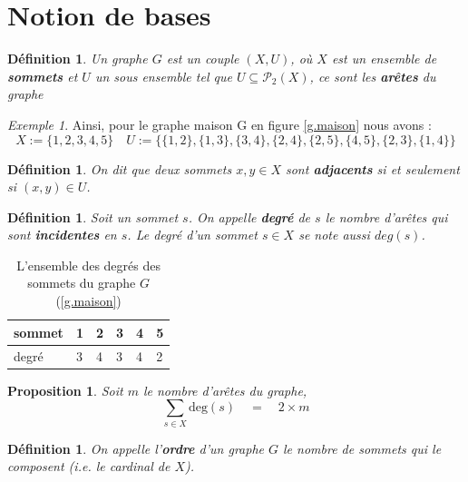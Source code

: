 \documentclass[12pt,a4paper]{scrartcl}
\theoremstyle{plain}
\newtheorem{proposition}[theoreme]{Proposition}
\newtheorem{definition}[theoreme]{Définition}
\theoremstyle{remark}
\newtheorem*{exemple}{Exemple}
\begin{document}
\section{Notion de bases}

\begin{definition}
Un graphe $G$ est un couple $(X,U)$, où $X$ est un ensemble de \textbf{sommets} et
$U$ un sous ensemble tel que $U \subseteq \mathcal{P}_2(X)$, ce sont les \textbf{arêtes} du graphe 
\end{definition}

\begin{exemple}
	Ainsi, pour le graphe maison G en figure \ref{g.maison} nous avons :
\[X:= \{ 1,2,3,4,5 \}\quad
U:= \{ \{1,2\},\{1,3\},\{3,4\},\{2,4\},\{2,5\},\{4,5\},\{2,3\},\{1,4\} \}\]	
\end{exemple}

\begin{definition}
	On dit que deux sommets $x,y \in X$ sont \textbf{adjacents} si et seulement si $(x,y) \in U$.
\end{definition}

\begin{definition}
	Soit un sommet $s$. On appelle \textbf{degré} de $s$ le nombre d'arêtes qui sont \textbf{incidentes} en $s$. Le degré d'un sommet $s \in X$ se note aussi $deg(s)$.
\end{definition}

\begin{table}[tbp]
	\centering
	\begin{tabular}{|l|l|l|l|l|l|}
	\hline
	sommet & 1 & 2 & 3 & 4 & 5 \\
	\hline
	degré  & 3 & 4 & 3 & 4 & 2 \\
	\hline
	\end{tabular}
	\caption{L'ensemble des degrés des sommets du graphe $G$ (\ref{g.maison})}\label{t.deg}
	\end{table}

\begin{proposition}
	Soit $m$ le nombre d'arêtes du graphe,
	\begin{equation}
		\sum_{s \in X} \text{deg}(s)\quad=\quad 2\times m
	\end{equation}\label{eq.degsum}
		
\end{proposition}

\begin{definition}
	On appelle l'\textbf{ordre} d'un graphe $G$ le nombre de sommets qui le composent (i.e. le cardinal de $X$).
\end{definition}
\end{document}
